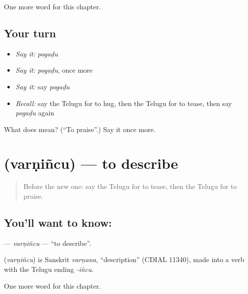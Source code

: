 \begin{grammarlens}[title={What you've built}]
One more word for this chapter.
\end{grammarlens}

\subsection*{Your turn}
\begin{itemize}
\raggedright
  \item \emph{Say it:} \emph{pogaḍu}
  \item \emph{Say it:} \emph{pogaḍu}, once more
  \item \emph{Say it:} say \emph{pogaḍu}
  \item \emph{Recall:} say the Telugu for to hug, then the Telugu for to tease, then say \emph{pogaḍu} again
\end{itemize}

\begin{tcolorbox}[breakable,colback=teal!4,colframe=teal!35!black,title={Before you move on}]
What does  mean? (\textquotedblleft{}To praise\textquotedblright{}.) Say it once more.
\end{tcolorbox}
\section[\texorpdfstring{\te{వర్ణించు} (varṇiñcu)}{వర్ణించు (varṇiñcu)}]{ (varṇiñcu) — to describe}

\label{lesson:TE-C162-varnincu}



\begin{quote}
Before the new one: say the Telugu for to tease, then the Telugu for to praise.
\end{quote}

\subsection*{You'll want to know: }
\textbf{} — \emph{varṇiñcu} — \textquotedblleft{}to describe\textquotedblright{}.

\begin{cousinweb}
\textbf{} (\emph{varṇiñcu}) is Sanskrit \emph{varṇana}, \textquotedblleft{}description\textquotedblright{} (CDIAL 11340), made into a verb with the Telugu ending \emph{-iñcu}.
\end{cousinweb}

\begin{grammarlens}[title={What you've built}]
One more word for this chapter.
\end{grammarlens}

